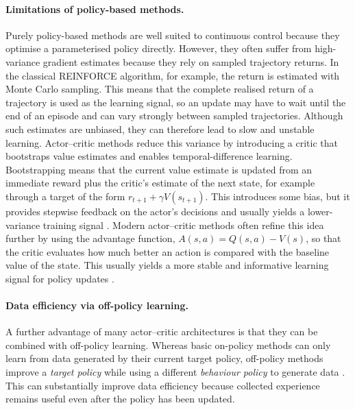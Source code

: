 \paragraph{Limitations of policy-based methods.}
Purely policy-based methods are well suited to continuous control because they optimise a parameterised policy directly. However, they often suffer from high-variance gradient estimates because they rely on sampled trajectory returns. In the classical REINFORCE algorithm, for example, the return is estimated with Monte Carlo sampling. This means that the complete realised return of a trajectory is used as the learning signal, so an update may have to wait until the end of an episode and can vary strongly between sampled trajectories. Although such estimates are unbiased, they can therefore lead to slow and unstable learning. Actor--critic methods reduce this variance by introducing a critic that bootstraps value estimates and enables temporal-difference learning. Bootstrapping means that the current value estimate is updated from an immediate reward plus the critic's estimate of the next state, for example through a target of the form $r_{t+1} + \gamma V(s_{t+1})$. This introduces some bias, but it provides stepwise feedback on the actor's decisions and usually yields a lower-variance training signal \cite{sutton_reinforcement_2020}. Modern actor--critic methods often refine this idea further by using the advantage function, $A(s,a) = Q(s,a) - V(s)$, so that the critic evaluates how much better an action is compared with the baseline value of the state. This usually yields a more stable and informative learning signal for policy updates \cite{schulman_proximal_2017}.

\paragraph{Data efficiency via off-policy learning.}
A further advantage of many actor--critic architectures is that they can be combined with off-policy learning. Whereas basic on-policy methods can only learn from data generated by their current target policy, off-policy methods improve a \emph{target policy} while using a different \emph{behaviour policy} to generate data \cite{sutton_reinforcement_2020}. This can substantially improve data efficiency because collected experience remains useful even after the policy has been updated.


